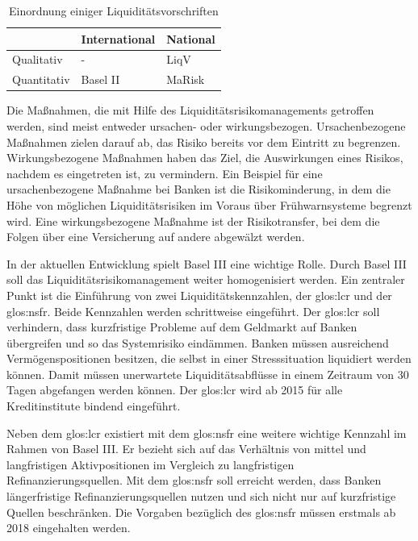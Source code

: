 \begin{onehalfspacing}
{
\setlength{\extrarowheight}{2pt}
\begin{table}[ht]
\centering
\begin{tabular}{| l | >{\centering\arraybackslash} m{4cm} | >{\centering\arraybackslash} m{4cm} |}
\cline{2-3}
\multicolumn{1}{l|}{}	& International & National 		\\	\hline
Qualitativ 				& - 			& \gls{LiqV}	\\	\hline
Quantitativ 			& Basel II 		& \gls{MaRisk}	\\	\hline
\end{tabular} 
\caption{Einordnung einiger Liquiditätsvorschriften \label{table:einordnung}}
\end{table}
}

Die Maßnahmen, die mit Hilfe des Liquiditätsrisikomanagements getroffen werden, sind meist entweder ursachen- oder wirkungsbezogen. Ursachenbezogene Maßnahmen zielen darauf ab, das Risiko bereits vor dem Eintritt zu begrenzen. Wirkungsbezogene Maßnahmen haben das Ziel, die Auswirkungen eines Risikos, nachdem es eingetreten ist, zu vermindern. Ein Beispiel für eine ursachenbezogene Maßnahme bei Banken ist die Risikominderung, in dem die Höhe von möglichen Liquiditätsrisiken im Voraus über Frühwarnsysteme begrenzt wird. Eine wirkungsbezogene Maßnahme ist der Risikotransfer, bei dem die Folgen über eine Versicherung auf andere abgewälzt werden.


In der aktuellen Entwicklung spielt Basel III eine wichtige Rolle. Durch Basel III soll das Liquiditätsrisikomanagement weiter homogenisiert werden. Ein zentraler Punkt ist die Einführung von zwei Liquiditätskennzahlen, der \gls{glos:lcr} und der \gls{glos:nsfr}. Beide Kennzahlen werden schrittweise eingeführt. Der \gls{glos:lcr} soll verhindern, dass kurzfristige Probleme auf dem Geldmarkt auf Banken übergreifen und so das Systemrisiko eindämmen. Banken müssen ausreichend Vermögenspositionen besitzen, die selbst in einer Stresssituation liquidiert werden können. Damit müssen unerwartete Liquiditätsabflüsse in einem Zeitraum von 30 Tagen abgefangen werden können. Der \gls{glos:lcr} wird ab 2015 für alle Kreditinstitute bindend eingeführt.

Neben dem \gls{glos:lcr} existiert mit dem \gls{glos:nsfr} eine weitere wichtige Kennzahl im Rahmen von Basel III. Er bezieht sich auf das Verhältnis von mittel und langfristigen Aktivpositionen im Vergleich zu langfristigen Refinanzierungsquellen. Mit dem \gls{glos:nsfr} soll erreicht werden, dass Banken längerfristige Refinanzierungsquellen nutzen und sich nicht nur auf kurzfristige Quellen beschränken. Die Vorgaben bezüglich des \gls{glos:nsfr} müssen erstmals ab 2018 eingehalten werden.


\end{onehalfspacing}
